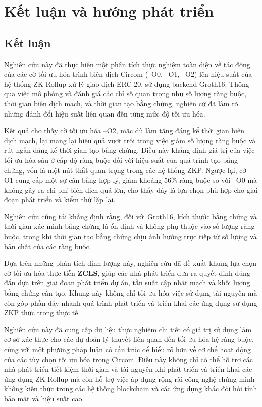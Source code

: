 \chapter{Kết luận và hướng phát triển}
\label{chap:chap6}
\section{Kết luận}
Nghiên cứu này đã thực hiện một phân tích thực nghiệm toàn diện về tác động của các cờ tối ưu hóa trình biên dịch Circom (–O0, –O1, –O2) lên hiệu suất của hệ thống ZK-Rollup xử lý giao dịch ERC-20, sử dụng backend Groth16. Thông qua việc mô phỏng và đánh giá các chỉ số quan trọng như số lượng ràng buộc, thời gian biên dịch mạch, và thời gian tạo bằng chứng, nghiên cứ đã làm rõ những đánh đổi hiệu suất liên quan đến từng mức độ tối ưu hóa.

Kết quả cho thấy cờ tối ưu hóa –O2, mặc dù làm tăng đáng kể thời gian biên dịch mạch, lại mang lại hiệu quả vượt trội trong việc giảm số lượng ràng buộc và rút ngắn đáng kể thời gian tạo bằng chứng. Điều này khẳng định giá trị của việc tối ưu hóa sâu ở cấp độ ràng buộc đối với hiệu suất của quá trình tạo bằng chứng, vốn là một nút thắt quan trọng trong các hệ thống ZKP. Ngược lại, cờ –O1 cung cấp một sự cân bằng hợp lý, giảm khoảng 56\% ràng buộc so với –O0 mà không gây ra chi phí biên dịch quá lớn, cho thấy đây là lựa chọn phù hợp cho giai đoạn
phát triển và kiểm thử lặp lại. 

Nghiên cứu cũng tái khẳng định rằng, đối với Groth16, kích thước bằng chứng và thời gian xác minh bằng chứng là ổn định và không phụ thuộc vào số lượng ràng buộc, trong khi thời gian tạo bằng chứng chịu ảnh hưởng trực tiếp từ số lượng và bản chất của các ràng buộc. 

Dựa trên những phân tích định lượng này, nghiên cứu đã đề xuất khung lựa chọn cờ tối ưu hóa thực tiễn \textbf{ZCLS}, giúp các nhà phát triển đưa ra quyết định đúng đắn dựa trên giai đoạn phát triển dự án, tần suất cập nhật mạch và khối lượng bằng chứng cần tạo. Khung này không chỉ tối ưu hóa việc sử dụng tài nguyên mà còn góp phần đẩy nhanh quá trình phát triển và triển khai các ứng dụng sử dụng ZKP thức trong thực tế.

Nghiên cứu này đã cung cấp dữ liệu thực nghiệm chi tiết có giá trị sử dụng làm cơ sở xác thực cho các dự đoán lý thuyết liên quan đến tối ưu hóa hệ ràng buộc, cùng với một phương pháp luận có cấu trúc để hiểu rõ hơn về cơ chế hoạt động của các tùy chọn tối ưu hóa trong Circom. Điều này không chỉ có thể hỗ trợ các nhà phát triển tiết kiệm thời gian và tài nguyên khi phát triển và triển khai các ứng dụng ZK-Rollup mà còn hỗ trợ việc áp dụng rộng rãi công nghệ chứng minh không kiến thức trong các hệ thống blockchain và các ứng dụng khác đòi hỏi tính bảo mật và hiệu suất cao.

